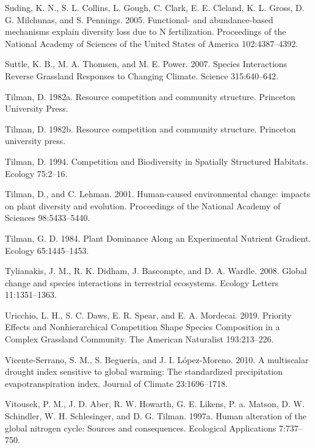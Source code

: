 \documentclass[twoside,12pt,final]{ucthesis-CA2012}
\begin{document}
\begin{ucmainmatter}
\leavevmode\hypertarget{ref-Suding2005}{}%
Suding, K. N., S. L. Collins, L. Gough, C. Clark, E. E. Cleland, K. L. Gross, D. G. Milchunas, and S. Pennings. 2005. Functional- and abundance-based mechanisms explain diversity loss due to N fertilization. Proceedings of the National Academy of Sciences of the United States of America 102:4387--4392.

\leavevmode\hypertarget{ref-Suttle2007}{}%
Suttle, K. B., M. A. Thomsen, and M. E. Power. 2007. Species Interactions Reverse Grassland Responses to Changing Climate. Science 315:640--642.

\leavevmode\hypertarget{ref-tilman1982resource}{}%
Tilman, D. 1982a. Resource competition and community structure. Princeton University Press.

\leavevmode\hypertarget{ref-Tilman1982}{}%
Tilman, D. 1982b. Resource competition and community structure. Princeton university press.

\leavevmode\hypertarget{ref-Tilman1994}{}%
Tilman, D. 1994. Competition and Biodiversity in Spatially Structured Habitats. Ecology 75:2--16.

\leavevmode\hypertarget{ref-Tilman2001}{}%
Tilman, D., and C. Lehman. 2001. Human-caused environmental change: impacts on plant diversity and evolution. Proceedings of the National Academy of Sciences 98:5433--5440.

\leavevmode\hypertarget{ref-Tilman1984}{}%
Tilman, G. D. 1984. Plant Dominance Along an Experimental Nutrient Gradient. Ecology 65:1445--1453.

\leavevmode\hypertarget{ref-Tylianakis2008}{}%
Tylianakis, J. M., R. K. Didham, J. Bascompte, and D. A. Wardle. 2008. Global change and species interactions in terrestrial ecosystems. Ecology Letters 11:1351--1363.

\leavevmode\hypertarget{ref-Uricchio2019}{}%
Uricchio, L. H., S. C. Daws, E. R. Spear, and E. A. Mordecai. 2019. Priority Effects and Nonhierarchical Competition Shape Species Composition in a Complex Grassland Community. The American Naturalist 193:213--226.

\leavevmode\hypertarget{ref-Vicente-Serrano2010}{}%
Vicente-Serrano, S. M., S. Beguería, and J. I. López-Moreno. 2010. A multiscalar drought index sensitive to global warming: The standardized precipitation evapotranspiration index. Journal of Climate 23:1696--1718.

\leavevmode\hypertarget{ref-Vitousek1997b}{}%
Vitousek, P. M., J. D. Aber, R. W. Howarth, G. E. Likens, P. a. Matson, D. W. Schindler, W. H. Schlesinger, and D. G. Tilman. 1997a. Human alteration of the global nitrogen cycle: Sources and consequences. Ecological Applications 7:737--750.


\end{ucmainmatter}
\end{document}
